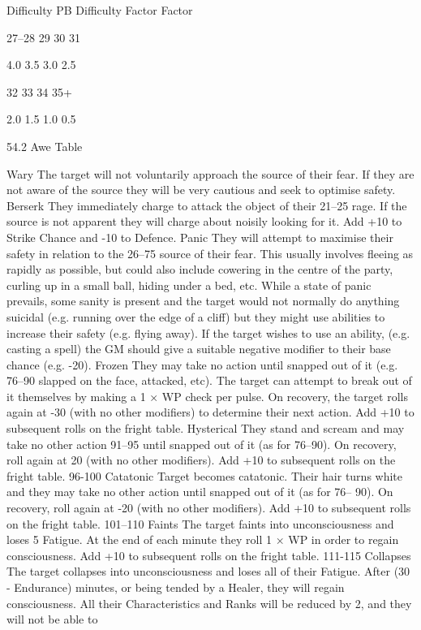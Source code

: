 \documentclass[a4paper]{article}
\begin{document}
\begin{multicols}{3}
Difficulty PB Difficulty
Factor
Factor

27–28
29
30
31

4.0
3.5
3.0
2.5

32
33
34
35+

2.0
1.5
1.0
0.5

54.2 Awe Table

Wary The target will not voluntarily approach the source of their
fear. If they are not aware of the source they will be very cautious
and seek to optimise safety.
Berserk They immediately charge to attack the object of their
21–25
rage. If the source is not apparent they will charge about noisily
looking for it. Add +10 to Strike Chance and -10 to Defence.
Panic They will attempt to maximise their safety in relation to the
26–75
source of their fear. This usually involves fleeing as rapidly as
possible, but could also include cowering in the centre of the
party, curling up in a small ball, hiding under a bed, etc. While a
state of panic prevails, some sanity is present and the target would
not normally do anything suicidal (e.g. running over the edge of a
cliff) but they might use abilities to increase their safety (e.g.
flying away). If the target wishes to use an ability, (e.g. casting a
spell) the GM should give a suitable negative modifier to their
base chance (e.g. -20).
Frozen They may take no action until snapped out of it (e.g.
76–90
slapped on the face, attacked, etc). The target can attempt to break
out of it themselves by making a 1 × WP check per pulse. On
recovery, the target rolls again at -30 (with no other modifiers) to
determine their next action. Add +10 to subsequent rolls on the
fright table.
Hysterical They stand and scream and may take no other action
91–95
until snapped out of it (as for 76–90). On recovery, roll again at 20 (with no other modifiers). Add +10 to subsequent rolls on the
fright table.
96-100 Catatonic Target becomes catatonic. Their hair turns white and
they may take no other action until snapped out of it (as for 76–
90). On recovery, roll again at -20 (with no other modifiers). Add
+10 to subsequent rolls on the fright table.
101–110 Faints The target faints into unconsciousness and loses 5 Fatigue.
At the end of each minute they roll 1 × WP in order to regain
consciousness. Add +10 to subsequent rolls on the fright table.
111-115 Collapses The target collapses into unconsciousness and loses all
of their Fatigue. After (30 - Endurance) minutes, or being tended
by a Healer, they will regain consciousness. All their Characteristics and Ranks will be reduced by 2, and they will not be able to

\end{multicols}
\end{document}
